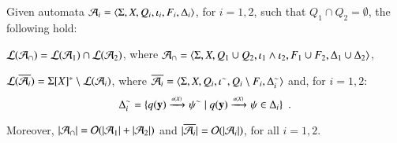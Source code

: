 \documentclass{llncs}
\begin{document}
\begin{theorem}\label{thm:closure}
  Given automata $\mathcal{A}_i = \langle \Sigma,X,Q_i,\iota_i,F_i,\Delta_i \rangle$,
  for $i=1,2$, such that $Q_1 \cap Q_2 = \emptyset$, the following hold: 
  \begin{compactenum}
    \item\label{it1:thm:closure} ${\mathcal L}({\mathcal{A}_\cap}) = {\mathcal L}({\mathcal{A}_1}) \cap {\mathcal L}({\mathcal{A}_2})$, where
      $\mathcal{A}_\cap = \langle \Sigma,X,Q_1 \cup Q_2, \iota_1 \wedge \iota_2,
      F_1 \cup F_2, \Delta_1 \cup \Delta_2 \rangle$, 
    \item\label{it2:thm:closure} ${\mathcal L}({\overline{\mathcal{A}_i}}) = \Sigma[X]^*
      \setminus {\mathcal L}({\mathcal{A}_i})$, where $\overline{\mathcal{A}_i} =
      \langle \Sigma,X,Q_i,{\iota}^{\sim},Q_i\setminus
        F_i,{\Delta}^{\sim}_i \rangle$ and, for $i=1,2$: \[{\Delta}^{\sim}_i =
      \{ q(\mathbf y) \xrightarrow{{\scriptscriptstyle a(X)}}_{{\scriptstyle }} {\psi}^{\sim} \mid
        q(\mathbf y) \xrightarrow{{\scriptscriptstyle a(X)}}_{{\scriptstyle }} \psi \in
        \Delta_i \}\enspace.\]
  \end{compactenum}
  Moreover, ${|{\mathcal{A}_\cap}|} = \mathcal{O}({{|{\mathcal{A}_1}|}+{|{\mathcal{A}_2}|}})$ and
  ${|{\overline{\mathcal{A}_i}}|} = \mathcal{O}({{|{\mathcal{A}_i}|}})$, for all $i=1,2$.
\end{theorem}
\end{document}

